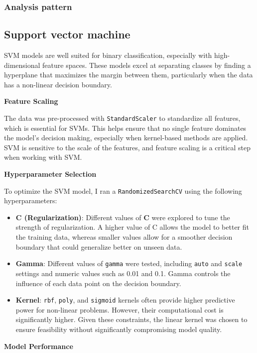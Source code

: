 \documentclass[a4paper, twoside]{article}
\begin{document}
\subsubsection{Analysis pattern}

\subsection{Support vector machine}
SVM models are well suited for binary classification, especially with high-dimensional feature spaces. These models excel at separating classes by finding a hyperplane that maximizes the margin between them, particularly when the data has a non-linear decision boundary.

\textbf{Feature Scaling}

The data was pre-processed with \texttt{StandardScaler} to standardize all features, which is essential for SVMs. This helps ensure that no single feature dominates the model's decision making, especially when kernel-based methods are applied. SVM is sensitive to the scale of the features, and feature scaling is a critical step when working with SVM.

\textbf{Hyperparameter Selection}

To optimize the SVM model, I ran a \texttt{RandomizedSearchCV} using the following hyperparameters:

\begin{itemize}[noitemsep]
    \item \textbf{C (Regularization)}: Different values of \textbf{C} were explored to tune the strength of regularization. A higher value of C allows the model to better fit the training data, whereas smaller values allow for a smoother decision boundary that could generalize better on unseen data.
    \item \textbf{Gamma}: Different values of \texttt{gamma} were tested, including \texttt{auto} and \texttt{scale} settings and numeric values such as 0.01 and 0.1. Gamma controls the influence of each data point on the decision boundary.
    \item \textbf{Kernel}: \texttt{rbf}, \texttt{poly}, and \texttt{sigmoid} kernels often provide higher predictive power for non-linear problems. However, their computational cost is significantly higher. Given these constraints, the linear kernel was chosen to ensure feasibility without significantly compromising model quality.
\end{itemize}

\textbf{Model Performance}
\end{document}
